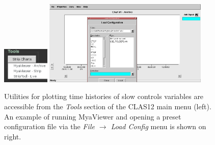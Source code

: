 \documentclass[amsmath,amssymb,notitlepage,11pt]{revtex4}
\begin{document}
\begin{figure}[htbp]\centering
    \includegraphics[width=0.2\textwidth]{pics/strips}
    \includegraphics[width=0.7\textwidth]{pics/myaviewer}
    \caption{Utilities for plotting time histories of slow controls variables are accessible from the {\em Tools} section of the CLAS12 main menu (left).  An example of running MyaViewer and opening a preset configuration file via the {\em File $\rightarrow$ Load Config} menu is shown on right.\label{fig:strips}}
\end{figure}
\end{document}

